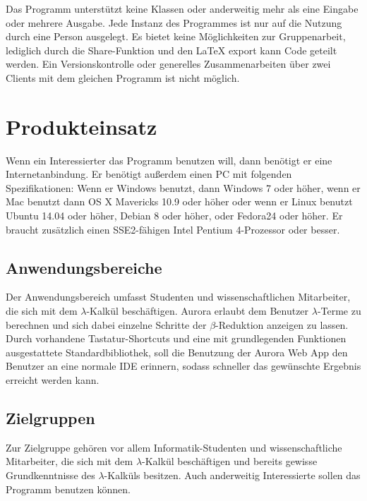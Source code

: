 \documentclass[parskip=full,11pt,twoside]{scrartcl}
\begin{document}
Das Programm unterstützt keine Klassen oder anderweitig mehr als eine Eingabe oder mehrere Ausgabe.
Jede Instanz des Programmes ist nur auf die Nutzung durch eine Person ausgelegt. Es bietet keine Möglichkeiten zur Gruppenarbeit, lediglich durch die Share-Funktion und den LaTeX export kann Code geteilt werden.
\newline
Ein Versionskontrolle oder generelles Zusammenarbeiten über zwei Clients mit dem gleichen Programm ist nicht möglich.



\newpage
\section{Produkteinsatz}

Wenn ein Interessierter das Programm benutzen will, dann benötigt er eine Internetanbindung. Er benötigt außerdem einen PC mit folgenden Spezifikationen: Wenn er Windows benutzt, dann Windows 7 oder höher, wenn er Mac benutzt dann OS X Mavericks 10.9 oder höher oder wenn er Linux benutzt Ubuntu 14.04 oder höher, Debian 8 oder höher, oder Fedora24 oder höher.
Er braucht zusätzlich einen SSE2-fähigen Intel Pentium 4-Prozessor oder besser.

\subsection{Anwendungsbereiche}

Der Anwendungsbereich umfasst Studenten und wissenschaftlichen Mitarbeiter, die sich mit dem $\lambda$-Kalkül beschäftigen. Aurora erlaubt dem Benutzer $\lambda$-Terme zu berechnen und sich dabei einzelne Schritte der $\beta$-Reduktion anzeigen zu lassen. Durch vorhandene Tastatur-Shortcuts und eine mit grundlegenden Funktionen ausgestattete Standardbibliothek, soll die Benutzung der Aurora Web App den Benutzer an eine normale IDE erinnern, sodass schneller das gewünschte Ergebnis erreicht werden kann.

\subsection{Zielgruppen}

Zur Zielgruppe gehören vor allem Informatik-Studenten und wissenschaftliche Mitarbeiter, die sich mit dem $\lambda$-Kalkül beschäftigen und bereits gewisse Grundkenntnisse des $\lambda$-Kalküls besitzen. Auch anderweitig Interessierte sollen das Programm benutzen können.
\end{document}
